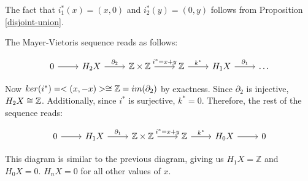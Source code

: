 \begin{example}
The fact that $i_1^*(x)=(x,0)$ and $i_2^*(y)=(0,y)$ follows from Proposition \ref{disjoint-union}.

The Mayer-Vietoris sequence reads as follows:

\[\begin{tikzcd}
0 \arrow[r] & H_2 X \arrow[r, "\partial_2"] & \mathbb{Z}\times \mathbb{Z} \arrow[r, "i^*=x+y"] & \mathbb{Z} \arrow[r, "k^*"] & H_1X \arrow[r, "\partial_1"] & \dots
\end{tikzcd}\]

Now $ker(i^*)=<(x,-x)>\cong \mathbb{Z}=im(\partial_2)$ by exactness. Since $\partial_2$ is injective, $H_2 X\cong \mathbb{Z}$. Additionally, since $i^*$ is surjective, $k^*=0$. Therefore, the rest of the sequence reads:

\[\begin{tikzcd}
0 \arrow[r] & H_1 X \arrow[r, "\partial_1"] & \mathbb{Z}\times \mathbb{Z} \arrow[r, "i^*=x+y"] & \mathbb{Z} \arrow[r, "k^*"] & H_0X \arrow[r] & 0
\end{tikzcd}\]

This diagram is similar to the previous diagram, giving us $H_1 X=\mathbb{Z}$ and $H_0 X= 0$. $H_nX =0$ for all other values of $x$.
\end{example}